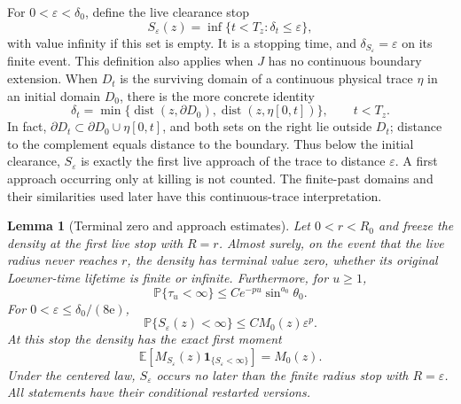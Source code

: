 \documentclass[11pt]{article}
\newtheorem{lemma}[theorem]{Lemma}
\theoremstyle{definition}
\theoremstyle{remark}
\numberwithin{equation}{section}
\begin{document}
For $0<\varepsilon<\delta_0$, define the live clearance stop
\[
 S_\varepsilon(z)=\inf\{t<T_z:\delta_t\le\varepsilon\},
\]
with value infinity if this set is empty.  It is a stopping time, and
$\delta_{S_\varepsilon}=\varepsilon$ on its finite event.  This definition
also applies when $J$ has no continuous boundary extension.
When $D_t$ is the surviving domain of a continuous physical trace
$\eta$ in an initial domain $D_0$, there is the more concrete identity
\begin{equation}\label{ll:trace-clearance}
 \delta_t=\min\{\operatorname{dist}(z,\partial D_0),
                  \operatorname{dist}(z,\eta[0,t])\},\qquad t<T_z.
\end{equation}
In fact, $\partial D_t\subset\partial D_0\cup\eta[0,t]$, and both sets
on the right lie outside $D_t$; distance to the complement equals
distance to the boundary.  Thus below the initial clearance,
$S_\varepsilon$ is exactly the first live approach of the trace to
distance $\varepsilon$.  A first approach occurring only at killing
is not counted.  The finite-past domains and their similarities used
later have this continuous-trace interpretation.

\begin{lemma}[Terminal zero and approach estimates]\label{ll:approach}
Let $0<r<R_0$ and freeze the density at the first live stop with $R=r$.
Almost surely, on the event that the live radius never reaches $r$, the
density has terminal value zero,
whether its original Loewner-time lifetime is finite or infinite.
Furthermore, for $u\ge1$,
\begin{equation}
 \mathbb P\{\tau_u<\infty\}
 \le C e^{-pu}\sin^{a_0}\theta_0.
 \label{ll:radius-approach}
\end{equation}
For $0<\varepsilon\le\delta_0/(8\mathrm e)$,
\begin{equation}
 \mathbb P\{S_\varepsilon(z)<\infty\}
       \le C M_0(z)\varepsilon^p.
 \label{ll:euclidean-approach}
\end{equation}
At this stop the density has the exact first moment
\begin{equation}\label{ll:clearance-first-moment}
 \mathbb E\!\left[M_{S_\varepsilon}(z)
          \mathbf1_{\{S_\varepsilon<\infty\}}\right]=M_0(z).
\end{equation}
Under the centered law, $S_\varepsilon$ occurs no later than the finite
radius stop with $R=\varepsilon$.
All statements have their conditional restarted versions.
\end{lemma}
\end{document}
